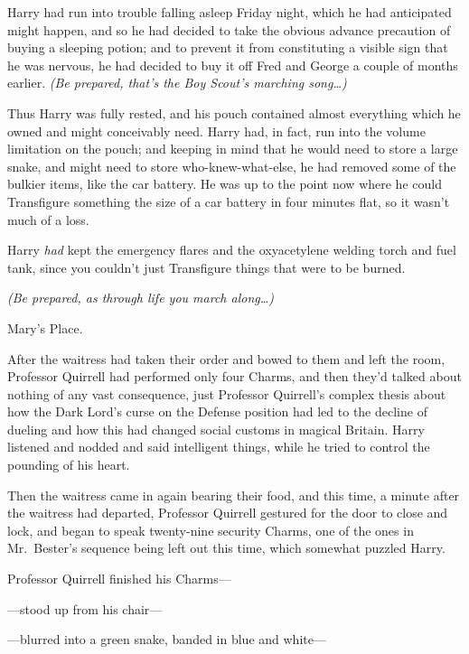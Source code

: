

\hplettrineextrapara
Harry had run into trouble falling asleep Friday night, which he had anticipated might happen, and so he had decided to take the obvious advance precaution of buying a sleeping potion; and to prevent it from constituting a visible sign that he was nervous, he had decided to buy it off Fred and George a couple of months earlier. \emph{(Be prepared, that's the Boy Scout's marching song{\ldots})}

Thus Harry was fully rested, and his pouch contained almost everything which he owned and might conceivably need. Harry had, in fact, run into the volume limitation on the pouch; and keeping in mind that he would need to store a large snake, and might need to store who-knew-what-else, he had removed some of the bulkier items, like the car battery. He was up to the point now where he could Transfigure something the size of a car battery in four minutes flat, so it wasn't much of a loss.

Harry \emph{had} kept the emergency flares and the oxyacetylene welding torch and fuel tank, since you couldn't just Transfigure things that were to be burned.

\emph{(Be prepared, as through life you march along{\ldots})}

Mary's Place.

After the waitress had taken their order and bowed to them and left the room, Professor Quirrell had performed only four Charms, and then they'd talked about nothing of any vast consequence, just Professor Quirrell's complex thesis about how the Dark Lord's curse on the Defense position had led to the decline of dueling and how this had changed social customs in magical Britain. Harry listened and nodded and said intelligent things, while he tried to control the pounding of his heart.

Then the waitress came in again bearing their food, and this time, a minute after the waitress had departed, Professor Quirrell gestured for the door to close and lock, and began to speak twenty-nine security Charms, one of the ones in Mr.~Bester's sequence being left out this time, which somewhat puzzled Harry.

Professor Quirrell finished his Charms—

—stood up from his chair—

—blurred into a green snake, banded in blue and white—


